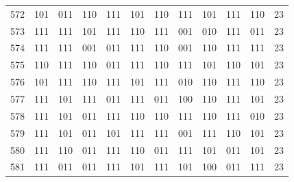 \begin{longtable}{r*{10}{c}r}
572 & 101 & 011 & 110 & 111 & 101 & 110 & 111 & 101 & 111 & 110 & 23\\
573 & 111 & 111 & 101 & 111 & 110 & 111 & 001 & 010 & 111 & 011 & 23\\
574 & 111 & 111 & 001 & 011 & 111 & 110 & 001 & 110 & 111 & 111 & 23\\
575 & 110 & 111 & 110 & 011 & 111 & 110 & 111 & 101 & 110 & 101 & 23\\
576 & 101 & 111 & 110 & 111 & 101 & 111 & 010 & 110 & 111 & 110 & 23\\
577 & 111 & 101 & 111 & 011 & 111 & 011 & 100 & 110 & 111 & 101 & 23\\
578 & 111 & 101 & 011 & 111 & 110 & 110 & 111 & 110 & 111 & 010 & 23\\
579 & 111 & 101 & 011 & 101 & 111 & 111 & 001 & 111 & 110 & 101 & 23\\
580 & 111 & 110 & 011 & 111 & 110 & 011 & 111 & 101 & 011 & 101 & 23\\
581 & 111 & 011 & 011 & 111 & 101 & 111 & 101 & 100 & 011 & 111 & 23\\
\bottomrule
\end{longtable}